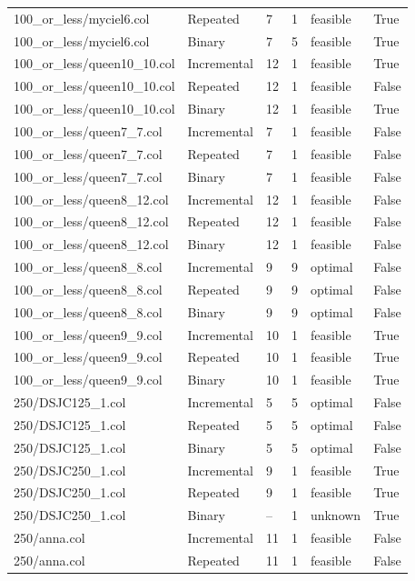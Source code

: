 \begin{table}[htbp]
\begin{tabular}{llllll}
100\_or\_less/myciel6.col & Repeated & 7 & 1 & feasible & True \\
100\_or\_less/myciel6.col & Binary & 7 & 5 & feasible & True \\
100\_or\_less/queen10\_10.col & Incremental & 12 & 1 & feasible & True \\
100\_or\_less/queen10\_10.col & Repeated & 12 & 1 & feasible & False \\
100\_or\_less/queen10\_10.col & Binary & 12 & 1 & feasible & True \\
100\_or\_less/queen7\_7.col & Incremental & 7 & 1 & feasible & False \\
100\_or\_less/queen7\_7.col & Repeated & 7 & 1 & feasible & False \\
100\_or\_less/queen7\_7.col & Binary & 7 & 1 & feasible & False \\
100\_or\_less/queen8\_12.col & Incremental & 12 & 1 & feasible & False \\
100\_or\_less/queen8\_12.col & Repeated & 12 & 1 & feasible & False \\
100\_or\_less/queen8\_12.col & Binary & 12 & 1 & feasible & False \\
100\_or\_less/queen8\_8.col & Incremental & 9 & 9 & optimal & False \\
100\_or\_less/queen8\_8.col & Repeated & 9 & 9 & optimal & False \\
100\_or\_less/queen8\_8.col & Binary & 9 & 9 & optimal & False \\
100\_or\_less/queen9\_9.col & Incremental & 10 & 1 & feasible & True \\
100\_or\_less/queen9\_9.col & Repeated & 10 & 1 & feasible & True \\
100\_or\_less/queen9\_9.col & Binary & 10 & 1 & feasible & True \\
250/DSJC125\_1.col & Incremental & 5 & 5 & optimal & False \\
250/DSJC125\_1.col & Repeated & 5 & 5 & optimal & False \\
250/DSJC125\_1.col & Binary & 5 & 5 & optimal & False \\
250/DSJC250\_1.col & Incremental & 9 & 1 & feasible & True \\
250/DSJC250\_1.col & Repeated & 9 & 1 & feasible & True \\
250/DSJC250\_1.col & Binary & -- & 1 & unknown & True \\
250/anna.col & Incremental & 11 & 1 & feasible & False \\
250/anna.col & Repeated & 11 & 1 & feasible & False \\

\end{tabular}
\end{table}

